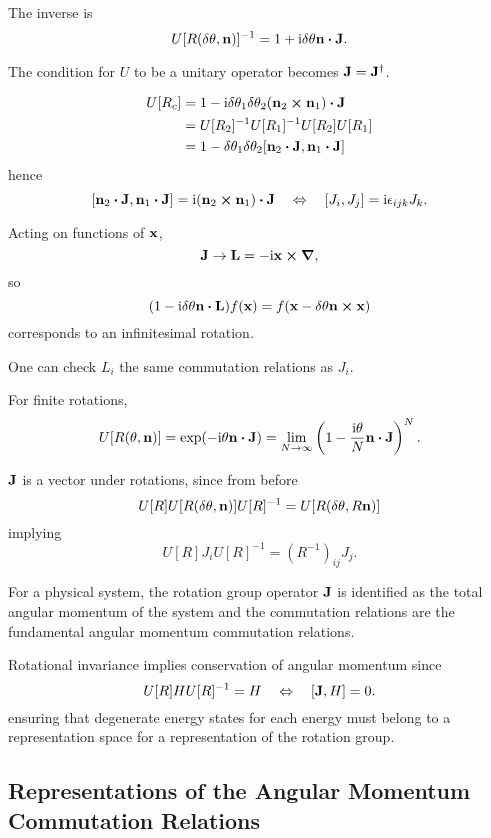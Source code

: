 \documentclass[a4paper,11pt]{article}
\begin{document}
	The inverse is
	\[
		U[R(\delta \theta, \vb n)]^{-1} = 1 + \mathrm{i} \delta \theta \vb n \vdot \vb J.
	\]
	
	The condition for $U$ to be a unitary operator becomes $\vb J = \vb J^\dagger$.

	\begin{align*}
		U[R_c] & = 1 - \mathrm{i} \delta \theta_1 \delta \theta_2 (\vb n_2 \cross \vb n_1) \vdot \vb J\\
		& = U[R_2]^{-1} U[R_1]^{-1} U[R_2] U[R_1]\\
		& = 1 - \delta \theta_1 \delta \theta_2 [\vb n_2 \vdot \vb J , \vb n_1 \vdot \vb J]
	\end{align*}
	hence
	\[
		[\vb n_2 \vdot \vb J, \vb n_1 \vdot \vb J] = \mathrm{i}(\vb n_2 \cross \vb n_1) \vdot \vb J \quad \Leftrightarrow \quad [J_i, J_j] = \mathrm{i} \epsilon _{ijk}J_k.
	\]
	
	Acting on functions of $\vb x$, 
	\[
		\vb J \to \vb L = - \mathrm{i} \vb x \cross \grad,
	\]
	so 
	\[
		(1 - \mathrm{i} \delta \theta \vb n \vdot \vb L)f(\vb x) = f(\vb x - \delta \theta \vb n \cross \vb x)
	\]
	corresponds to an infinitesimal rotation. 

	One can check $L_i$ the same commutation relations as $J_i$.

	For finite rotations,
	\[
		U[R(\theta,\vb n)] = \exp(- \mathrm{i} \theta \vb n \vdot \vb J) = \lim _{N \to \infty}\left(1 - \frac{\mathrm{i}\theta}{N} \vb n \vdot \vb J\right)^N.
	\]
	
	$\vb J$ is a vector under rotations, since from before 
	\[
		U[R] U[R(\delta \theta, \vb n)]U[R]^{-1} = U[R(\delta \theta, R\vb n)]
	\]
	implying 
	\[
		U[R]J_i U[R]^{-1} = (R^{-1})_{ij} J_j.
	\]
	
	For a physical system, the rotation group operator $\vb J$ is identified as the total angular momentum of the system and the commutation relations are the fundamental angular momentum commutation relations.
	
	Rotational invariance implies conservation of angular momentum since 
	\[
		U[R] H U[R]^{-1} = H \quad \Leftrightarrow \quad [\vb J, H] = 0.
	\]
	ensuring that degenerate energy states for each energy must belong to a representation space for a representation of the rotation group.

	\subsection{Representations of the Angular Momentum Commutation Relations}
\end{document}
